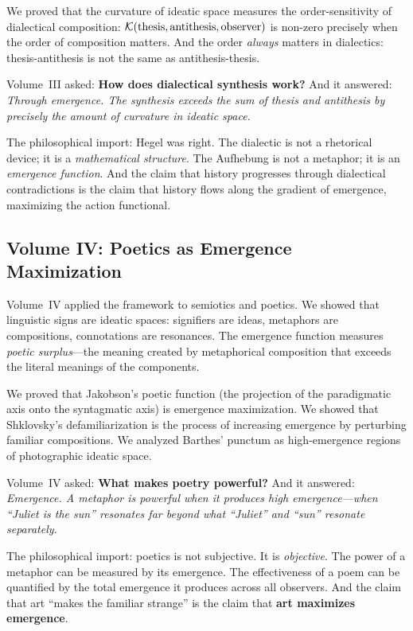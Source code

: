 We proved that the curvature of ideatic space measures the order-sensitivity
of dialectical composition: $\mathcal{K}(\text{thesis}, \text{antithesis},
\text{observer})$ is non-zero precisely when the order of composition matters.
And the order \emph{always} matters in dialectics: thesis-antithesis is not
the same as antithesis-thesis.

Volume~III asked: \textbf{How does dialectical synthesis work?} And it
answered: \emph{Through emergence. The synthesis exceeds the sum of thesis
and antithesis by precisely the amount of curvature in ideatic space.}

The philosophical import: Hegel was right. The dialectic is not a rhetorical
device; it is a \emph{mathematical structure}. The Aufhebung is not a
metaphor; it is an \emph{emergence function}. And the claim that history
progresses through dialectical contradictions is the claim that history flows
along the gradient of emergence, maximizing the action functional.

\subsection{Volume IV: Poetics as Emergence Maximization}

Volume~IV applied the framework to semiotics and poetics. We showed that
linguistic signs are ideatic spaces: signifiers are ideas, metaphors are
compositions, connotations are resonances. The emergence function measures
\emph{poetic surplus}---the meaning created by metaphorical composition that
exceeds the literal meanings of the components.

We proved that Jakobson's poetic function (the projection of the paradigmatic
axis onto the syntagmatic axis) is emergence maximization. We showed that
Shklovsky's defamiliarization is the process of increasing emergence by
perturbing familiar compositions. We analyzed Barthes' punctum as high-emergence
regions of photographic ideatic space.

Volume~IV asked: \textbf{What makes poetry powerful?} And it answered:
\emph{Emergence. A metaphor is powerful when it produces high emergence---when
``Juliet is the sun'' resonates far beyond what ``Juliet'' and ``sun''
resonate separately.}

The philosophical import: poetics is not subjective. It is \emph{objective}.
The power of a metaphor can be measured by its emergence. The effectiveness
of a poem can be quantified by the total emergence it produces across all
observers. And the claim that art ``makes the familiar strange'' is the claim
that \textbf{art maximizes emergence}.

